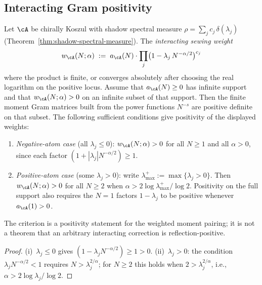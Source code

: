 \subsection{Interacting Gram positivity}%
\label{subsec:interacting-gram-positivity}%

\begin{theorem}%
\label{thm:interacting-gram-positivity}%
Let $\cA$ be chirally Koszul with shadow spectral measure
$\rho = \sum_j c_j\,\delta(\lambda_j)$
\textup{(}Theorem~\textup{\ref{thm:shadow-spectral-measure}}\textup{)}.
The \emph{interacting sewing weight}
\begin{equation}\label{eq:interacting-weight}
w_\cA(N;\alpha)
\;:=\;
a_\cA(N)\cdot
\prod_j\bigl(1 - \lambda_j\,N^{-\alpha/2}\bigr)^{c_j}
\end{equation}
where the product is finite, or converges absolutely after choosing the
real logarithm on the positive locus. Assume that
$a_\cA(N)\geq 0$ has infinite support and that
$w_\cA(N;\alpha)>0$ on an infinite subset of that support. Then the
finite moment Gram matrices built from the power functions $N^{-s}$ are
positive definite on that subset. The following sufficient conditions
give positivity of the displayed weights:
\begin{enumerate}[label=\textup{(\roman*)}]
\item \emph{Negative-atom case}
 \textup{(}all $\lambda_j \leq 0$\textup{):}
 $w_\cA(N;\alpha) > 0$ for all $N \geq 1$
 and all $\alpha > 0$, since each factor
 $(1 + |\lambda_j|N^{-\alpha/2}) \geq 1$.
\item \emph{Positive-atom case}
 \textup{(}some $\lambda_j > 0$\textup{):}
 write $\lambda_{\max}^+ := \max\{\lambda_j > 0\}$.
 Then $w_\cA(N;\alpha) > 0$ for all $N \geq 2$ when
 $\alpha > 2\log\lambda_{\max}^+/\log 2$. Positivity on the full
 support also requires the $N=1$ factors
 $1-\lambda_j$ to be positive whenever $a_\cA(1)>0$.
\end{enumerate}
The criterion is a positivity statement for the weighted moment
pairing; it is not a theorem that an arbitrary interacting correction is
reflection-positive.
\end{theorem}

\begin{proof}
(i)~$\lambda_j \leq 0$ gives
$(1 - \lambda_j N^{-\alpha/2}) \geq 1 > 0$.
(ii)~$\lambda_j > 0$: the condition
$\lambda_j N^{-\alpha/2} < 1$ requires
$N > \lambda_j^{2/\alpha}$; for $N \geq 2$ this holds when
$2 > \lambda_j^{2/\alpha}$, i.e.,
$\alpha > 2\log\lambda_j/\log 2$.
\end{proof}

